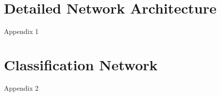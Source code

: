 \documentclass[conference]{IEEEtran}
\begin{document}
\printbibsection

\appendices

\renewcommand{\thesection}{\Alph{section}}

\section{Detailed Network Architecture}

Appendix 1

\section{Classification Network}

Appendix 2
\end{document}
